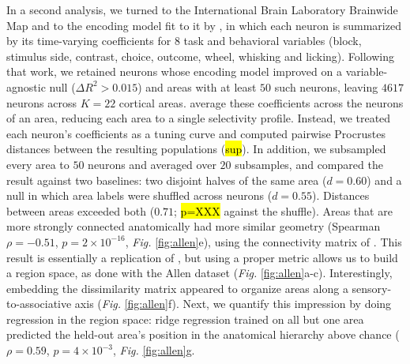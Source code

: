In a second analysis, we turned to the International Brain Laboratory Brainwide Map \parencite{angelaki2025brain} and to the encoding model fit to it by \textcite{posani2026}, in which each neuron is summarized by its time-varying coefficients for $8$ task and behavioral variables (block, stimulus side, contrast, choice, outcome, wheel, whisking and licking). Following that work, we retained neurons whose encoding model improved on a variable-agnostic null ($\Delta R^2 > 0.015$) and areas with at least $50$ such neurons, leaving $4617$ neurons across $K = 22$ cortical areas. \textcite{posani2026} average these coefficients across the neurons of an area, reducing each area to a single selectivity profile. Instead, we treated each neuron's coefficients as a tuning curve and computed pairwise Procrustes distances between the resulting populations (\hl{sup}). In addition, we subsampled every area to $50$ neurons and averaged over $20$ subsamples, and compared the result against two baselines: two disjoint halves of the same area ($d=0.60$) and a null in which area labels were shuffled across neurons ($d = 0.55$). Distances between areas exceeded both ($0.71$; \hl{p=XXX} against the shuffle). Areas that are more strongly connected anatomically had more similar geometry (Spearman $\rho = -0.51$, $p = 2\times10^{-16}$, \textit{Fig.} \ref{fig:allen}e), using the connectivity matrix of \textcite{harris2019,posani2026}. This result is essentially a replication of \textcite{posani2026}, but using a proper metric allows us to build a region space, as done with the Allen dataset (\textit{Fig.} \ref{fig:allen}a-c). Interestingly, embedding the dissimilarity matrix appeared to organize areas along a sensory-to-associative axis (\textit{Fig.} \ref{fig:allen}f). Next, we quantify this impression by doing regression in the region space: ridge regression trained on all but one area predicted the held-out area's position in the anatomical hierarchy above chance ($\rho = 0.59$, $p = 4\times10^{-3}$, \textit{Fig.} \ref{fig:allen}g.

